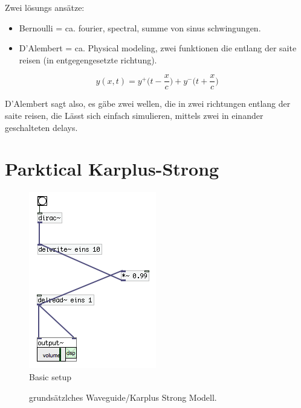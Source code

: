 Zwei lösungs ansätze:
\begin{itemize}
	\item Bernoulli = ca. fourier, spectral, summe von sinus schwingungen.
	\item D'Alembert = ca. Physical modeling, zwei funktionen die entlang der saite reisen (in entgegengesetzte richtung).
\end{itemize}


\begin{equation}
y(x, t) = y ^+ \Bigg(t - \frac{x}{c}\Bigg) + y^- \Bigg(t + \frac{x}{c} \Bigg)
\end{equation}

D'Alembert sagt also, es gäbe zwei wellen, die in zwei richtungen entlang der saite reisen, die Lässt sich einfach simulieren, mittels zwei in einander geschalteten delays.

\section{Parktical Karplus-Strong}
\begin{figure}[h]
	\begin{center}
		\includegraphics[scale = 1.]{img/karplusSimple.png}
		\caption{Basic setup}
		\label{fig:karplusBasic}
	\end{center}
\end{figure}

  \begin{figure}[htb]
  \centering
  \caption{grundsätzlches Waveguide/Karplus Strong Modell.}
  \label{fig:string}

\end{figure}

